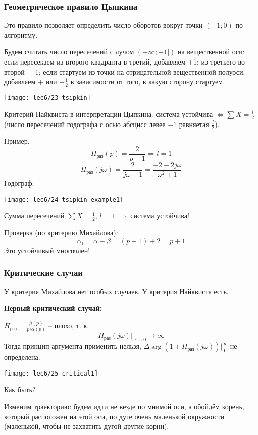 \documentclass[main.tex]{subfiles}
\begin{document}
\subsubsection{Геометрическое правило Цыпкина}

Это правило позволяет определить число оборотов вокруг точки $ (-1;0) $ по алгоритму.

Будем считать число пересечений с лучом $ ( - \infty; -1 ]) $ на вещественной оси: если пересекаем из второго квадранта в третий, добавляем +1; из третьего во второй -- -1; если стартуем из точки на отрицательной вещественной полуоси, добавляем + или $ - \frac{1}{2} $ в зависимости от того, в какую сторону стартуем.

\texttt{[image: lec6/23\_tsipkin]}

Критерий Найквиста в интерпретации Цыпкина: система устойчива $ \Leftrightarrow  \sum X = \frac{l}{2}$ (число пересечений годографа с осью абсцисс левее $ -1 $ равняетая $ \frac{l}{2} $).

Пример.
$$ H_{\text{раз}}(p) = \frac{2}{p-1} \Rightarrow l = 1 $$
$$ H_{\text{раз}}(j \omega) = \frac{2}{j \omega - 1} = \frac{-2 - 2 j \omega}{\omega^2 + 1} $$
Годограф:

\texttt{[image: lec6/24\_tsipkin\_example1]}

Сумма пересечений $ \sum X = \frac{1}{2}  $, $ l = 1 $ $ \Rightarrow $ система устойчива!

Проверка (по критерию Михайлова):
$$ \alpha_{\text{з}} = \alpha + \beta = (p - 1) + 2 = p + 1 $$
Это устойчивый многочлен!

\subsubsection{Критические случаи}
У критерия Михайлова нет особых случаев.
У критерия Найквиста есть.

\textbf{Первый критический случай:}

$ H_{\text{раз}} = \frac{\beta(p)}{p^s \alpha(p)} $ -- плохо, т. к.
$$ H_{\text{раз}}(j \omega)|_{\omega \to 0} \to \infty $$
Тогда принцип аргумента применить нельзя, $ \Delta \arg (1 + H_{\text{раз}}(j \omega)) |_0^{\infty} $ не  определена.

\texttt{[image: lec6/25\_critical1]}

Как быть?

Изменим траекторию: будем идти не везде по мнимой оси, а обойдём корень, который расположен на этой оси, по дуге очень маленькой окружности (маленькой, чтобы не захватить дугой другие корни).
\end{document}
